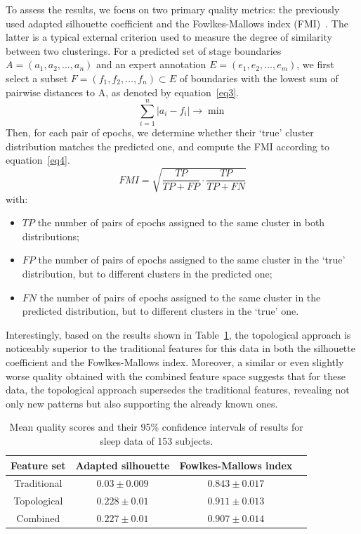\documentclass[journal,twoside,web]{ieeecolor2}
\begin{document}
To assess the results, we focus on two primary quality metrics: the previously used adapted silhouette coefficient and the Fowlkes-Mallows index (FMI)~\cite{Fowlkes01091983}. The latter is a typical external criterion used to measure the degree of similarity between two clusterings. For a predicted set of stage boundaries $A = (a_1, a_2, \dots, a_n)$ and an expert annotation $E = (e_1, e_2, \dots, e_m)$, we first select a subset $F = (f_1, f_2, \dots, f_n) \subset E$ of boundaries with the lowest sum of pairwise distances to A, as denoted by equation~\ref{eq3}.
\begin{equation}
    \sum_{i = 1}^{n} |a_i - f_i| \rightarrow \min \label{eq3}
\end{equation}
Then, for each pair of epochs, we determine whether their `true' cluster distribution matches the predicted one, and compute the FMI according to equation~\ref{eq4}.
\begin{equation}
    FMI = \sqrt{\frac{TP}{TP + FP} \cdot \frac{TP}{TP + FN}} \label{eq4}
\end{equation}
with:
\begin{itemize}
    \item
        $TP$ the number of pairs of epochs assigned to the same cluster in both distributions;
    \item
        $FP$ the number of pairs of epochs assigned to the same cluster in the `true' distribution, but to different clusters in the predicted one;
    \item
        $FN$ the number of pairs of epochs assigned to the same cluster in the predicted distribution, but to different clusters in the `true' one.
\end{itemize}

Interestingly, based on the results shown in Table~\ref{table2}, the topological approach is noticeably superior to the traditional features for this data in both the silhouette coefficient and the Fowlkes-Mallows index. Moreover, a similar or even slightly worse quality obtained with the combined feature space suggests that for these data, the topological approach supersedes the traditional features, revealing not only new patterns but also supporting the already known ones.

\begin{table}
\begin{center}
\caption{Mean quality scores and their 95\% confidence intervals of results for sleep data of 153 subjects.}
\label{table2}
\begin{tabular}{| c | c | c | c |}
  \hline
    Feature set & Adapted silhouette & Fowlkes-Mallows index \\
  \hline
    Traditional & $0.03 \pm 0.009$  & $0.843 \pm 0.017$ \\
    Topological & $0.228 \pm 0.01 $ & $0.911 \pm 0.013$ \\
    Combined &  $0.227 \pm 0.01 $ & $0.907 \pm 0.014$ \\
  \hline
\end{tabular}
\end{center}
\end{table}
\end{document}

